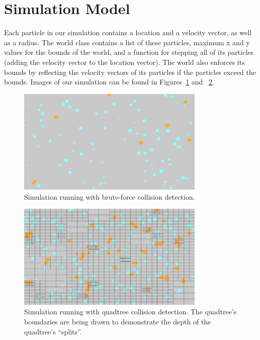     \section{Simulation Model}
      Each particle in our simulation contains a location and a velocity
      vector, as well as a radius. The world class contains a list of
      these particles, maximum x and y values for the bounds of the
      world, and a function for stepping all of its particles (adding
      the velocity vector to the location vector). The world also
      enforces its bounds by reflecting the velocity vectors of its
      particles if the particles exceed the bounds. Images of our
      simulation can be found in Figures~\ref{figure:simbrute} and
      ~\ref{figure:simquad}.

      \begin{figure}
	\centering
	\includegraphics[width=0.8\textwidth]{./img/sim2}
	\caption{Simulation running with brute-force collision
	detection.}
	\label{figure:simbrute}
      \end{figure}

      \begin{figure}
	\centering
	\includegraphics[width=0.8\textwidth]{./img/sim3}
	\caption{Simulation running with quadtree collision
	detection. The quadtree's boundaries are being drawn to
	demonstrate the depth of the quadtree's ``splits''.}
	\label{figure:simquad}
      \end{figure}

